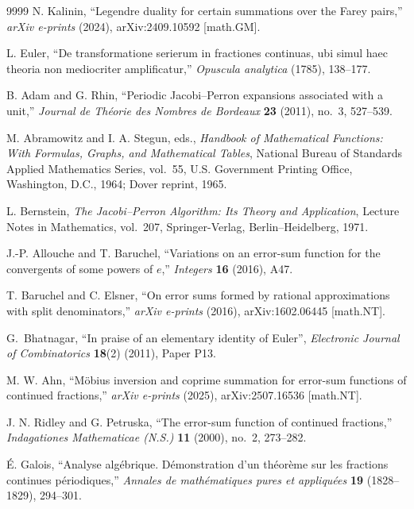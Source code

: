 \documentclass[]{interact}
\theoremstyle{plain}
\numberwithin{equation}{section} %
\numberwithin{table}{section} %
\numberwithin{figure}{section}
\begin{document}
\begin{thebibliography}{9999}
N. Kalinin,
``Legendre duality for certain summations over the Farey pairs,''
\emph{arXiv e-prints} (2024), arXiv:2409.10592 [math.GM].

L. Euler,
``De transformatione serierum in fractiones continuas, ubi simul haec theoria non mediocriter amplificatur,''
\emph{Opuscula analytica} (1785), 138--177.

B. Adam and G. Rhin,
``Periodic Jacobi--Perron expansions associated with a unit,''
\emph{Journal de Th\'eorie des Nombres de Bordeaux} \textbf{23} (2011), no.~3, 527--539.

M. Abramowitz and I. A. Stegun, eds.,
\emph{Handbook of Mathematical Functions: With Formulas, Graphs, and Mathematical Tables},
National Bureau of Standards Applied Mathematics Series, vol.~55,
U.S. Government Printing Office, Washington, D.C., 1964; Dover reprint, 1965.

L. Bernstein,
\emph{The Jacobi--Perron Algorithm: Its Theory and Application},
Lecture Notes in Mathematics, vol.~207,
Springer-Verlag, Berlin--Heidelberg, 1971.

J.-P. Allouche and T. Baruchel,
``Variations on an error-sum function for the convergents of some powers of $e$,''
\emph{Integers} \textbf{16} (2016), A47.

T. Baruchel and C. Elsner,
``On error sums formed by rational approximations with split denominators,''
\emph{arXiv e-prints} (2016), arXiv:1602.06445 [math.NT].

G.~Bhatnagar,
``In praise of an elementary identity of Euler'',
\emph{Electronic Journal of Combinatorics} \textbf{18}(2) (2011),
Paper P13.

M. W. Ahn,
``M\"obius inversion and coprime summation for error-sum functions of continued fractions,''
\emph{arXiv e-prints} (2025), arXiv:2507.16536 [math.NT].

J. N. Ridley and G. Petruska,
``The error-sum function of continued fractions,''
\emph{Indagationes Mathematicae (N.S.)} \textbf{11} (2000), no.~2, 273--282.

\'E. Galois,
``Analyse alg\'ebrique. D\'emonstration d'un th\'eor\`eme sur les fractions continues p\'eriodiques,''
\emph{Annales de math\'ematiques pures et appliqu\'ees} \textbf{19} (1828--1829), 294--301.


\end{thebibliography}
\end{document}
